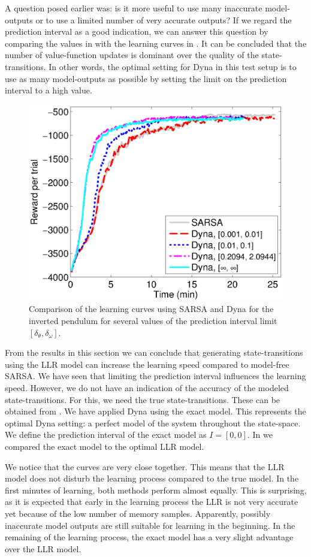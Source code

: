 A question posed earlier was: is it more useful to use many inaccurate model-outputs or to use a limited number of very accurate outputs? If we regard the prediction interval as a good indication, we can answer this question by comparing the values in  with the learning curves in . It can be concluded that the number of value-function updates is dominant over the quality of the state-transitions. In other words, the optimal setting for Dyna in this test setup is to use as many model-outputs as possible by setting the limit on the prediction interval to a high value.
\begin{figure}[htbp]
	\centering
		\includegraphics[width=.7\textwidth]{figures/PS-SARSAvsDYNA}
	\caption[Inverted pendulum: Dyna compared to SARSA]{Comparison of the learning curves using SARSA and Dyna for the inverted pendulum for several values of the prediction interval limit $[\delta_\theta,\delta_\omega]$.}
	\label{fig:PS-SARSAvsDYNA}
\end{figure}

From the results in this section we can conclude that generating state-transitions using the \ac{LLR} model can increase the learning speed compared to model-free SARSA. We have seen that limiting the prediction interval influences the learning speed. However, we do not have an indication of the accuracy of the modeled state-transitions. For this, we need the true state-transitions. These can be obtained from . We have applied Dyna using the exact model. This represents the optimal Dyna setting: a perfect model of the system throughout the state-space. We define the prediction interval of the exact model as $I = [0, 0]$. In  we compared the exact model to the optimal \ac{LLR} model. 

We notice that the curves are very close together. This means that the \ac{LLR} model does not disturb the learning process compared to the true model. In the first minutes of learning, both methods perform almost equally. This is surprising, as it is expected that early in the learning process the \ac{LLR} is not very accurate yet because of the low number of memory samples. Apparently, possibly inaccurate model outputs are still suitable for learning in the beginning. In the remaining of the learning process, the exact model has a very slight advantage over the \ac{LLR} model. 

